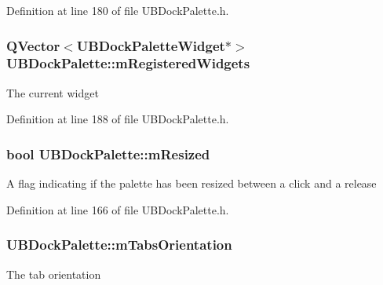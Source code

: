 Definition at line 180 of file U\-B\-Dock\-Palette.\-h.

\hypertarget{class_u_b_dock_palette_a06811fe8b1f887c8705882f408b6576f}{
\subsubsection[{m\-Registered\-Widgets}]{\setlength{\rightskip}{0pt plus 5cm}Q\-Vector$<${\bf U\-B\-Dock\-Palette\-Widget}$\ast$$>$ U\-B\-Dock\-Palette\-::m\-Registered\-Widgets\hspace{0.3cm}{\ttfamily [protected]}}}\label{dc/d54/class_u_b_dock_palette_a06811fe8b1f887c8705882f408b6576f}
The current widget 

Definition at line 188 of file U\-B\-Dock\-Palette.\-h.

\hypertarget{class_u_b_dock_palette_aa4ccb0ada33ff1b10f9354f87df8f2f1}{
\subsubsection[{m\-Resized}]{\setlength{\rightskip}{0pt plus 5cm}bool U\-B\-Dock\-Palette\-::m\-Resized\hspace{0.3cm}{\ttfamily [protected]}}}\label{dc/d54/class_u_b_dock_palette_aa4ccb0ada33ff1b10f9354f87df8f2f1}
A flag indicating if the palette has been resized between a click and a release 

Definition at line 166 of file U\-B\-Dock\-Palette.\-h.

\hypertarget{class_u_b_dock_palette_aa285a86c3980a4a67e3c54e1d6a2e0df}{
\subsubsection[{m\-Tabs\-Orientation}]{ U\-B\-Dock\-Palette\-::m\-Tabs\-Orientation\hspace{0.3cm}{\ttfamily [protected]}}}\label{dc/d54/class_u_b_dock_palette_aa285a86c3980a4a67e3c54e1d6a2e0df}
The tab orientation 


